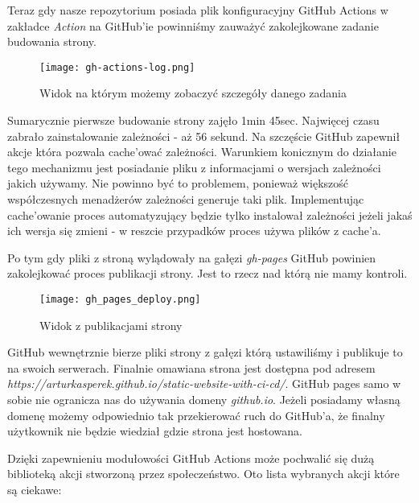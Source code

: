 \par
Teraz gdy nasze repozytorium posiada plik konfiguracyjny GitHub Actions w zakładce \textit{Action} na GitHub'ie powinniśmy zauważyć zakolejkowane zadanie budowania strony.
\begin{figure}[htbp]
  \centering
  \texttt{[image: gh-actions-log.png]}
  \caption{Widok na którym możemy zobaczyć szczegóły danego zadania}
  \label{fig:gh_actions_log}
\end{figure}
Sumarycznie pierwsze budowanie strony zajęło 1min 45sec. Najwięcej czasu zabrało zainstalowanie zależności - aż 56 sekund. Na szczęście GitHub zapewnił akcje która pozwala cache'ować zależności. Warunkiem konicznym do działanie tego mechanizmu jest posiadanie pliku z informacjami o wersjach zależności jakich używamy. Nie powinno być to problemem, ponieważ większość współczesnych menadżerów zależności generuje taki plik. Implementując cache'owanie proces automatyzujący będzie tylko instalował zależności jeżeli jakaś ich wersja się zmieni - w reszcie przypadków proces używa plików z cache'a.
\par
Po tym gdy pliki z stroną wylądowały na gałęzi \textit{gh-pages} GitHub powinien zakolejkować proces publikacji strony. Jest to rzecz nad którą nie mamy kontroli.
\begin{figure}[htbp]
  \centering
  \texttt{[image: gh\_pages\_deploy.png]}
  \caption{Widok z publikacjami strony}
  \label{fig:gh_pages_deploy}
\end{figure}
\par
GitHub wewnętrznie bierze pliki strony z gałęzi którą ustawiliśmy i publikuje to na swoich serwerach. Finalnie omawiana strona jest dostępna pod adresem \textit{https://arturkasperek.github.io/static-website-with-ci-cd/}. GitHub pages samo w sobie nie ogranicza nas do używania domeny \textit{github.io}. Jeżeli posiadamy własną domenę możemy odpowiednio tak przekierować ruch do GitHub'a, że finalny użytkownik nie będzie wiedział gdzie strona jest hostowana.
\par
Dzięki zapewnieniu modułowości GitHub Actions może pochwalić się dużą biblioteką akcji stworzoną przez społeczeństwo. Oto lista wybranych akcji które są ciekawe:
